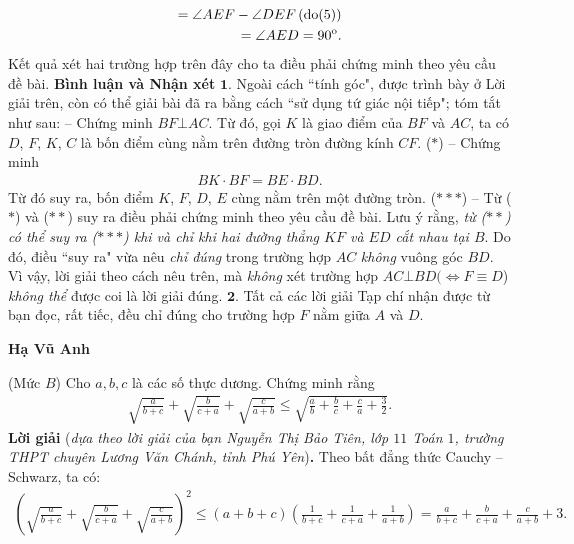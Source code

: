\begin{multicols}{2}
\begin{align*}
			 = \angle AEF - \angle DEF\left( {{\rm{do}}(5)} \right)\\
			 = \angle AED = {90^{\rm{o}}}.
	\end{align*}
	Kết quả xét hai trường hợp trên đây cho ta điều phải chứng minh theo yêu cầu đề bài.
	\vskip 0.05cm
	\textbf{Bình luận và Nhận xét}
	\vskip 0.05cm
	$\pmb{1.}$ Ngoài cách ``tính góc", được trình bày ở Lời giải trên, còn có thể giải bài đã ra bằng cách ``sử dụng tứ giác nội tiếp"; tóm tắt như sau:
	\vskip 0.05cm
	-- Chứng minh $BF \bot  AC$. Từ đó, gọi $K$ là giao điểm của $BF$ và $AC$, ta có $D$, $F$, $K$, $C$ là bốn điểm cùng nằm trên đường tròn đường kính $CF$. \hfill ($*$)
	\vskip 0.05cm
	-- Chứng minh
	\begin{align*}
		BK \cdot BF = BE \cdot BD. \tag{$**$}
	\end{align*}
	Từ đó suy ra, bốn điểm $K$, $F$, $D$, $E$ cùng nằm trên một đường tròn.                                                  \hfill ($***$)
	\vskip 0.05cm
	-- Từ ($*$) và ($**$) suy ra điều phải chứng minh theo yêu cầu đề bài.
	\vskip 0.05cm
	Lưu ý rằng, \textit{từ ($**$) có thể suy ra ($***$) khi và chỉ khi hai đường thẳng $KF$ và $ED$ cắt nhau tại $B$}. Do đó, điều ``suy ra" vừa nêu \textit{chỉ đúng} trong trường hợp $AC$ \textit{không} vuông góc $BD$. Vì vậy, lời giải theo cách nêu trên, mà \textit{không} xét trường hợp $AC \bot  BD (\Leftrightarrow F \equiv D$) \textit{không thể} được coi là lời giải đúng.
	\vskip 0.05cm
	$\pmb{2.}$ Tất cả các lời giải Tạp chí nhận được từ bạn đọc, rất tiếc, đều chỉ đúng cho trường hợp $F$ nằm giữa $A$ và $D$.
	\begin{flushright}
		\textbf{Hạ Vũ Anh}
	\end{flushright}
	{}
	(Mức $B$) Cho $a, b, c$ là các số thực dương. Chứng minh rằng
	\begin{align*}
		\sqrt{\!\!\frac{a}{b\!+\!c}}\!+\!\sqrt{\!\!\frac{b}{c\!+\!a}}\!+\!\sqrt{\!\!\frac{c}{a\!+\!b}}
		\!\leq\! \sqrt{\!\!\frac{a}{b}\!+\!\frac{b}{c}\!+\!\frac{c}{a}\!+\!\frac{3}{2}} .
	\end{align*}
	\textbf{Lời giải} (\textit{dựa theo lời giải của bạn Nguyễn Thị Bảo Tiên, lớp $11$ Toán $1$, trường THPT chuyên Lương Văn Chánh, tỉnh Phú Yên})\textbf{.}
	\vskip 0.05cm
	Theo bất đẳng thức Cauchy -- Schwarz, ta có:
	\begin{align*}
		{\left( {\sqrt {\frac{a}{{b + c}}}  + \sqrt {\frac{b}{{c + a}}}  + \sqrt {\frac{c}{{a + b}}} } \right)^2} \le (a + b + c)\left( {\frac{1}{{b + c}} + \frac{1}{{c + a}} + \frac{1}{{a + b}}} \right) = \frac{a}{{b + c}} + \frac{b}{{c + a}} + \frac{c}{{a + b}} + 3. \tag{$1$}

\end{align*}
\end{multicols}
